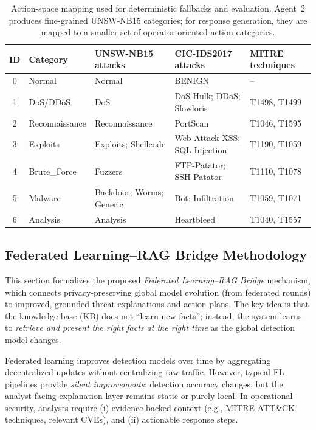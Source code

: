 \documentclass[conference]{IEEEtran}
\begin{document}
\begin{table}[t]
\caption{Action-space mapping used for deterministic fallbacks and evaluation. Agent~2 produces fine-grained UNSW-NB15 categories; for response generation, they are mapped to a smaller set of operator-oriented action categories.}
\label{tab:action_space}
\centering
\footnotesize
\setlength{\tabcolsep}{4pt}
\begin{tabularx}{\textwidth}{c l l l l}
\toprule
\textbf{ID} & \textbf{Category} & \textbf{UNSW-NB15 attacks} & \textbf{CIC-IDS2017 attacks} & \textbf{MITRE techniques}\\
\midrule
0 & Normal & Normal & BENIGN & --\\
1 & DoS/DDoS & DoS & DoS Hulk; DDoS; Slowloris & T1498, T1499\\
2 & Reconnaissance & Reconnaissance & PortScan & T1046, T1595\\
3 & Exploits & Exploits; Shellcode & Web Attack-XSS; SQL Injection & T1190, T1059\\
4 & Brute\_Force & Fuzzers & FTP-Patator; SSH-Patator & T1110, T1078\\
5 & Malware & Backdoor; Worms; Generic & Bot; Infiltration & T1059, T1071\\
6 & Analysis & Analysis & Heartbleed & T1040, T1557\\
\bottomrule
\end{tabularx}
\end{table}


\subsection{Federated Learning--RAG Bridge Methodology}
\label{sec:fl-rag-bridge-methods}

This section formalizes the proposed \emph{Federated Learning--RAG Bridge} mechanism, which connects privacy-preserving global model evolution (from federated rounds) to improved, grounded threat explanations and action plans. The key idea is that the knowledge base (KB) does not ``learn new facts''; instead, the system learns to \emph{retrieve and present the right facts at the right time} as the global detection model changes.

Federated learning improves detection models over time by aggregating decentralized updates without centralizing raw traffic. However, typical FL pipelines provide \emph{silent improvements}: detection accuracy changes, but the analyst-facing explanation layer remains static or purely local. In operational security, analysts require (i) evidence-backed context (e.g., MITRE ATT\&CK techniques, relevant CVEs), and (ii) actionable response steps.
\end{document}
